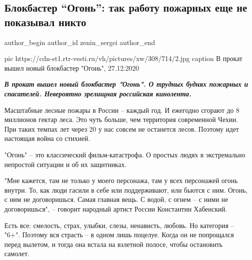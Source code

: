  
 
 
 
 
 
\subsection{Блокбастер \enquote{Огонь}: так работу пожарных еще не показывал никто}
\label{sec:27_12_2020.news.ru.vesti.zenin_sergei.1.ogon_blokbaster}
\ifcmt
  author_begin
   author_id zenin_sergei
  author_end
\fi

\ifcmt
pic https://cdn-st1.rtr-vesti.ru/vh/pictures/xw/308/714/2.jpg
caption В прокат вышел новый блокбастер "Огонь", 27.12.2020
\fi

\begin{leftbar}
  \begingroup
    \em\Large\bfseries\color{blue}
В прокат вышел новый блокбастер "Огонь". О трудных буднях пожарных и
спасателей. Невероятно зрелищная российская кинолента.
  \endgroup
\end{leftbar}

Масштабные лесные пожары в России – каждый год. И ежегодно сгорают до 8
миллионов гектар леса. Это чуть больше, чем территория современной Чехии. При
таких темпах лет через 20 у нас совсем не останется лесов. Поэтому идет
настоящая война со стихией.

"Огонь" – это классический фильм-катастрофа. О простых людях в экстремально
непростой ситуации и об их защитниках.

"Мне кажется, там не только у моего персонажа, там у всех персонажей огонь
внутри. То, как люди гасили в себе или поддерживают, или бьются с ним. Огонь, с
ним не договоришься. Самая главная вещь. С водой, с огнем – с ними не
договоришься", – говорит народный артист России Константин Хабенский.

Есть все: смелость, страх, улыбки, слезы, ненависть, любовь. Но категория –
"6+". Поэтому вся страсть – в одном лишь поцелуе. Когда он не попрощался перед
вылетом, и тогда она встала на взлетной полосе, чтобы остановить самолет.

